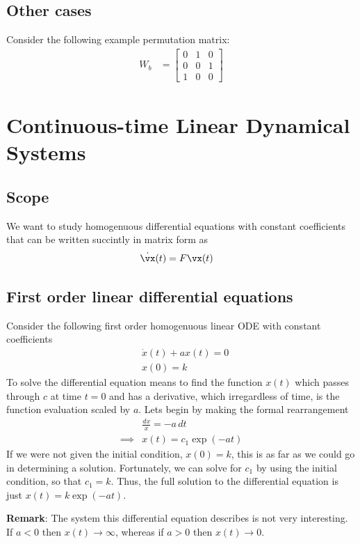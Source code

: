 \documentclass[a4paper,11pt]{exam}
\newcounter{ct}
\begin{document}
\begin{questions}
\subsection{Other cases}
Consider the following example permutation matrix:
\begin{align}\label{eq:nnm:ex:b}
W_b &=
\begin{bmatrix}
0 & 1 & 0\\
0 & 0 & 1\\
1 & 0 & 0
\end{bmatrix}
\end{align}


\section{Continuous-time Linear Dynamical Systems}
\subsection{Scope}
We want to study homogenuous differential equations with constant coefficients that can be written succintly in matrix form as
\begin{align}
    \dot{\vx}(t) &= F \vx(t)
\end{align}
\subsection{First order linear differential equations}
Consider the following first order homogenuous linear ODE with constant coefficients
\begin{align}
    &\dot{x}(t) + a x(t) = 0\\
    &x(0) = k
\end{align}
To solve the differential equation means to find the function $x(t)$ which passes through $c$ at time $t=0$ and has a derivative, which irregardless of time, is the function evaluation scaled by $a$.  Lets begin by making the formal rearrangement
\begin{align}
    &\frac{dx}{x} = - a \, dt\\
    \implies &x(t) = c_1 \exp(-at)
\end{align}
If we were not given the initial condition, $x(0)=k$, this is as far as we could go in determining a solution.  Fortunately, we can solve for $c_1$ by using the initial condition, so that $c_1 = k$.  Thus, the full solution to the differential equation is just $x(t) = k \exp(-at)$.  

\textbf{Remark}: The system this differential equation describes is not very interesting.  If $a < 0$ then $x(t) \rightarrow \infty$, whereas if $a > 0$ then $x(t) \rightarrow 0$.


\end{questions}
\end{document}
